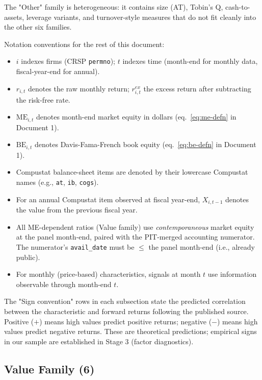 The "Other" family is heterogeneous: it contains size (AT), Tobin's Q,
cash-to-assets, leverage variants, and turnover-style measures that do
not fit cleanly into the other six families.

Notation conventions for the rest of this document:

\begin{itemize}
\item $i$ indexes firms (CRSP \texttt{permno}); $t$ indexes time
      (month-end for monthly data, fiscal-year-end for annual).
\item $r_{i,t}$ denotes the raw monthly return; $r^{ex}_{i,t}$ the
      excess return after subtracting the risk-free rate.
\item $\mathrm{ME}_{i,t}$ denotes month-end market equity in dollars
      (eq.~\ref{eq:me-defn} in Document 1).
\item $\mathrm{BE}_{i,t}$ denotes Davis-Fama-French book equity
      (eq.~\ref{eq:be-defn} in Document 1).
\item Compustat balance-sheet items are denoted by their lowercase
      Compustat names (e.g., \texttt{at}, \texttt{ib}, \texttt{cogs}).
\item For an annual Compustat item observed at fiscal year-end,
      $X_{i,t-1}$ denotes the value from the previous fiscal year.
\item All ME-dependent ratios (Value family) use \emph{contemporaneous}
      market equity at the panel month-end, paired with the PIT-merged
      accounting numerator. The numerator's \texttt{avail\_date} must
      be $\le$ the panel month-end (i.e., already public).
\item For monthly (price-based) characteristics, signals at month $t$
      use information observable through month-end $t$.
\end{itemize}

The "Sign convention" rows in each subsection state the predicted
correlation between the characteristic and forward returns following
the published source. Positive ($+$) means high values predict positive
returns; negative ($-$) means high values predict negative returns.
These are theoretical predictions; empirical signs in our sample are
established in Stage 3 (factor diagnostics).

\subsection{Value Family (6)}
\label{subsec:stage0-value}

